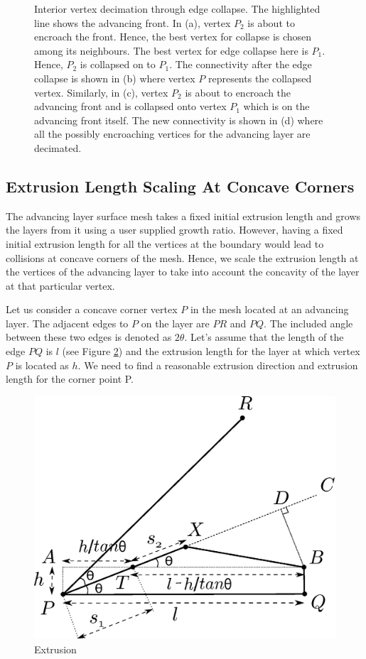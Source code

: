 \documentclass[conf]{new-aiaa}
\begin{document}
\begin{figure}[hbt!]
\caption{Interior vertex decimation through edge collapse. The highlighted line shows the advancing front. In (a), vertex $P_2$ is about to encroach the front. Hence, the best vertex for collapse is chosen among its neighbours. The best vertex for edge collapse here is $P_1$. Hence, $P_2$ is collapsed on to $P_1$. The connectivity after the edge collapse is shown in (b) where vertex $P$ represents the collapsed vertex. Similarly, in (c), vertex $P_2$ is about to encroach the advancing front and is collapsed onto vertex $P_1$ which is on the advancing front itself. The new connectivity is shown in (d) where all the possibly encroaching vertices for the advancing layer are decimated.}
\label{interior-vert-collapse}
\end{figure}

\subsection{Extrusion Length Scaling At Concave Corners}
\label{section-extrusionScaling}
The advancing layer surface mesh takes a fixed initial extrusion length and grows the layers from it using a user supplied growth ratio. However, having a fixed initial extrusion length for all the vertices at the boundary would lead to collisions at concave corners of the mesh. Hence, we scale the extrusion length at the vertices of the advancing layer to take into account the concavity of the layer at that particular vertex.

Let us consider a concave corner vertex $P$ in the mesh located at an advancing layer. The adjacent edges to $P$ on the layer are $PR$ and $PQ$. The included angle between these two edges is denoted as $2\theta$. Let's assume that the length of the edge $PQ$ is $l$ (see Figure \ref{fig:basic-diagram-extrusion-factor}) and the extrusion length for the layer at which vertex $P$ is located as $h$. We need to find a reasonable extrusion direction and extrusion length for the corner point P.

\begin{figure}[hbt!]
    \centering
    \includegraphics[width=.5\linewidth]{extrusionScaling/extrusionScaling.eps}
    \caption{Extrusion }
    \label{fig:basic-diagram-extrusion-factor}
\end{figure}
\end{document}
